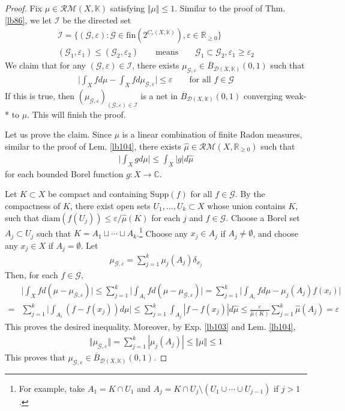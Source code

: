 \documentclass[12pt,b5paper,notitlepage]{article}
\theoremstyle{definition}
\theoremstyle{plain}
\newcommand{\wht}{\widehat}
\newcommand{\ovl}{\overline}
\newcommand{\scr}{\mathscr}
\newcommand{\Kbb}{\mathbb K}
\newcommand{\Cbb}{\mathbb C}
\newcommand{\Rbb}{\mathbb R}
\newcommand{\fin}{\mathrm{fin}}
\newcommand{\Supp}{\mathrm{Supp}}
\newcommand{\diam}{\mathrm{diam}}
\newcommand{\eps}{\varepsilon}
\newcommand{\MG}{\mathcal G}
\newcommand{\MD}{\mathcal D}
\newcommand{\RM}{\mathcal {RM}}
\numberwithin{equation}{section}
\begin{document}
\begin{proof}
Fix $\mu\in\RM(X,\Kbb)$ satisfying $\Vert\mu\Vert\leq 1$. Similar to the proof of Thm. \ref{lb86}, we let $\scr I$ be the directed set
\begin{gather*}
\scr I=\{(\MG,\eps):\MG\in\fin(2^{C_c(X,\Kbb)}),\eps\in\Rbb_{\geq0}\}\\
(\MG_1,\eps_1)\leq(\MG_2,\eps_2)\qquad\text{means}\qquad \MG_1\subset\MG_2,\eps_1\geq\eps_2
\end{gather*}
We claim that for any $(\MG,\eps)\in\scr I$, there exists $\mu_{\MG,\eps}\in\ovl B_{\MD(X,\Kbb)}(0,1)$ such that
\begin{align*}
\Big|\int_X fd\mu-\int_X fd\mu_{\MG,\eps}\Big |\leq\eps\qquad\text{for all }f\in\MG
\end{align*}
If this is true, then $(\mu_{\MG,\eps})_{(\MG,\eps)\in\scr I}$ is a net in $\ovl B_{\MD(X,\Kbb)}(0,1)$ converging weak-* to $\mu$. This will finish the proof.

Let us prove the claim. Since $\mu$ is a linear combination of finite Radon measures, similar to the proof of Lem. \ref{lb104}, there exists $\wht\mu\in\RM(X,\Rbb_{\geq0})$ such that
\begin{align*}
\Big|\int_X gd\mu\Big|\leq\int_X |g|d\wht\mu
\end{align*}
for each bounded Borel function $g:X\rightarrow\Cbb$.

Let $K\subset X$ be compact and containing $\Supp(f)$ for all $f\in\MG$. By the compactness of $K$, there exist open sets $U_1,\dots,U_k\subset X$ whose union contains $K$, such that $\diam(f(U_j))\leq \eps/\wht\mu(K)$ for each $j$ and $f\in\MG$. Choose a Borel set $A_j\subset U_j$ such that  $K=A_1\sqcup\cdots\sqcup A_k$.\footnote{For example, take $A_1=K\cap U_1$ and $A_j=K\cap U_j\setminus (U_1\cup\cdots\cup U_{j-1})$ if $j>1$.} Choose any $x_j\in A_j$ if $A_j\neq\emptyset$, and choose any $x_j\in X$ if $A_j=\emptyset$. Let
\begin{align}\label{eq56}
\mu_{\MG,\eps}=\sum_{j=1}^k\mu_j(A_j)\delta_{x_j}
\end{align}
Then, for each $f\in\MG$,
\begin{align*}
&\Big| \int_X fd(\mu-\mu_{\MG,\eps})\Big|\leq\sum_{j=1}^k\Big|\int_{A_i}fd(\mu-\mu_{\MG,\eps})\Big|=\sum_{j=1}^k\Big|\int_{A_i}fd\mu -\mu_j(A_j)f(x_i)\Big|\\
=&\sum_{j=1}^k\Big|\int_{A_i}(f-f(x_j))d\mu\Big|\leq\sum_{j=1}^k\int_{A_j}|f-f(x_j)|d\wht\mu\leq \frac{\eps}{\wht\mu(K)}\sum_{j=1}^k\wht\mu(A_j)=\eps
\end{align*}
This proves the desired inequality. Moreover, by Exp. \ref{lb103} and Lem. \ref{lb104},
\begin{align*}
\Vert\mu_{\MG,\eps}\Vert=\sum_{j=1}^k|\mu_j(A_j)|\leq\Vert\mu\Vert\leq1
\end{align*}
This proves that $\mu_{\MG,\eps}\in\ovl B_{\MD(X,\Kbb)}(0,1)$.
\end{proof}
\end{document}
